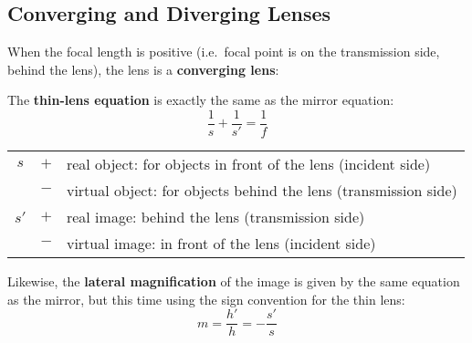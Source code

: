 %
%
%
\subsection{Converging and Diverging Lenses}
When the focal length is positive (i.e.\ focal point is on the transmission
side, behind the lens), the lens is a \textbf{converging lens}:
\begin{figure}[ht]
  \centering
\end{figure}

%
%
%
The \textbf{thin-lens equation} is exactly the same as the mirror equation:
\begin{equation}
  \boxed{\frac1s+\frac1{s'}=\frac1f}
\end{equation}

\begin{center}
  \begin{tabular}{ccl}
    \hline
    $s$ & $+$ & real object: for objects in front of the lens (incident side) \\
    & $-$ & virtual object: for objects behind the lens (transmission side)\\
    \hline
    $s'$ & $+$ & real image: behind the lens (transmission side)\\
    & $-$ & virtual image: in front of the lens (incident side)\\
    \hline
  \end{tabular}
\end{center}

Likewise, the \textbf{lateral magnification} of the image is given by the
same equation as the mirror, but this time using the sign convention for
the thin lens:
\begin{equation}
  \boxed{
    m=\frac{h'}h=-\frac{s'}s
  }
\end{equation}

